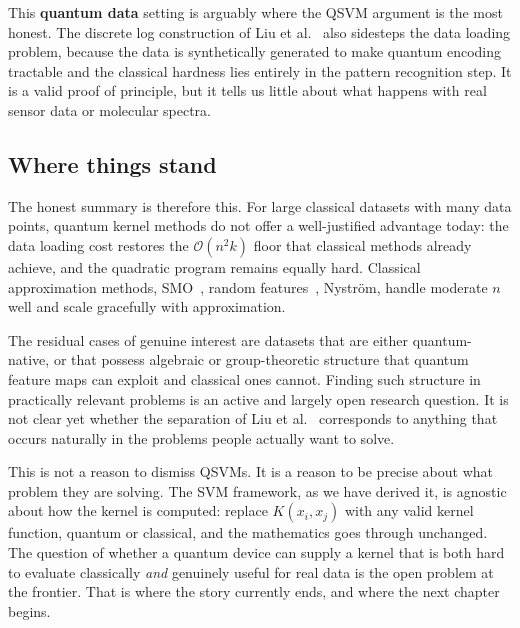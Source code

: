\documentclass[12pt,a4paper]{article}
\begin{document}
This \textbf{quantum data} setting is arguably where the QSVM argument is
the most honest. The discrete log construction of Liu et al.~\cite{Liu21}
also sidesteps the data loading problem, because the data is synthetically
generated to make quantum encoding tractable and the classical hardness lies
entirely in the pattern recognition step. It is a valid proof of principle,
but it tells us little about what happens with real sensor data or molecular
spectra.

\subsection{Where things stand}

The honest summary is therefore this. For large classical datasets with many
data points, quantum kernel methods do not offer a well-justified advantage
today: the data loading cost restores the $\mathcal{O}(n^2 k)$ floor that
classical methods already achieve, and the quadratic program remains equally
hard. Classical approximation methods,  SMO~\cite{Platt99}, random
features~\cite{Rahimi07}, Nyström,  handle moderate $n$ well and scale
gracefully with approximation.

The residual cases of genuine interest are datasets that are either
quantum-native, or that possess algebraic or group-theoretic structure that
quantum feature maps can exploit and classical ones cannot. Finding such
structure in practically relevant problems is an active and largely open
research question. It is not clear yet whether the separation of
Liu et al.~\cite{Liu21} corresponds to anything that occurs naturally in
the problems people actually want to solve.

This is not a reason to dismiss QSVMs. It is a reason to be precise about
what problem they are solving. The SVM framework, as we have derived it, is
agnostic about how the kernel is computed: replace $K(x_i, x_j)$ with any
valid kernel function, quantum or classical, and the mathematics goes through
unchanged. The question of whether a quantum device can supply a kernel that
is both hard to evaluate classically \emph{and} genuinely useful for real
data is the open problem at the frontier. That is where the story currently
ends, and where the next chapter begins.
\end{document}
